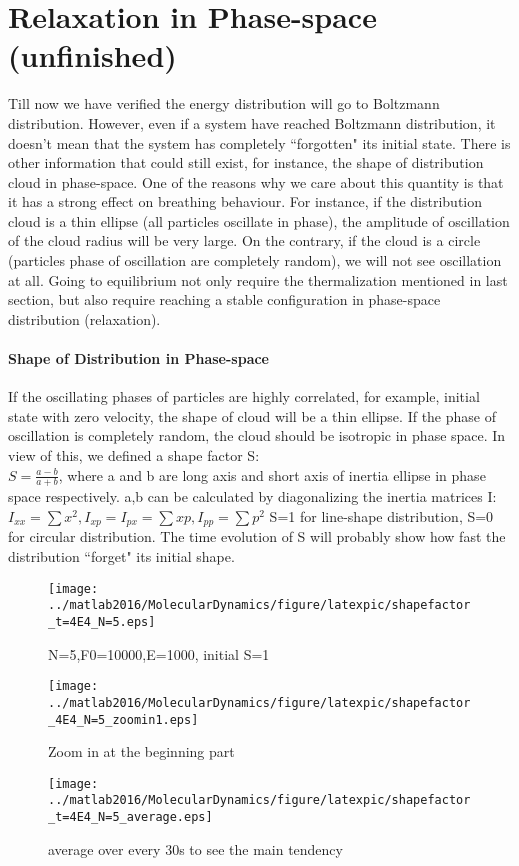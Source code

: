 \documentclass[a4paper,onecolumn,12pt]{article}
\begin{document}
\newpage
\section{Relaxation in Phase-space (unfinished)}
Till now we have verified the energy distribution will go to Boltzmann distribution. However, even if a system have reached Boltzmann distribution, it doesn't mean that the system has completely ``forgotten" its initial state. There is other information that could still exist, for instance, the shape of distribution cloud in phase-space. One of the reasons why we care about this quantity is that it has a strong effect on breathing behaviour. For instance, if the distribution cloud is a thin ellipse (all particles oscillate in phase), the amplitude of oscillation of the cloud radius will be very large. On the contrary, if the cloud is a circle (particles phase of oscillation are completely random), we will not see oscillation at all. Going to equilibrium not only require the thermalization mentioned in last section, but also require reaching a stable configuration in phase-space distribution (relaxation).


\paragraph{Shape of Distribution in Phase-space}
If the oscillating phases of particles are highly correlated, for example, initial state with zero velocity, the shape of cloud will be a thin ellipse. If the phase of oscillation is completely random, the cloud should be isotropic in phase space. In view of this, we defined a shape factor S:
\\$S=\frac{a-b}{a+b}$, where a and b are long axis and short axis of inertia ellipse in phase space respectively. a,b can be calculated by diagonalizing the inertia matrices I: $I_{xx}=\sum{x^2}, I_{xp}=I_{px}=\sum{xp},I_{pp}=\sum{p^2}$
S=1 for line-shape distribution, S=0 for circular distribution.
The time evolution of S will probably show how fast the distribution ``forget" its initial shape.  


\begin{figure}[hbtp]

\centering
\texttt{[image: ../matlab2016/MolecularDynamics/figure/latexpic/shapefactor\_t=4E4\_N=5.eps]}
\caption{N=5,F0=10000,E=1000, initial S=1}
\end{figure}
\begin{figure}[hbtp]
\centering
\texttt{[image: ../matlab2016/MolecularDynamics/figure/latexpic/shapefactor\_4E4\_N=5\_zoomin1.eps]} 
\caption{Zoom in at the beginning part}
\end{figure}
\begin{figure}[hbtp]
\centering
\texttt{[image: ../matlab2016/MolecularDynamics/figure/latexpic/shapefactor\_t=4E4\_N=5\_average.eps]}
\caption{average over every 30s to see the main tendency}
\label{fig:relaxationPS1}
\end{figure}
\end{document}
